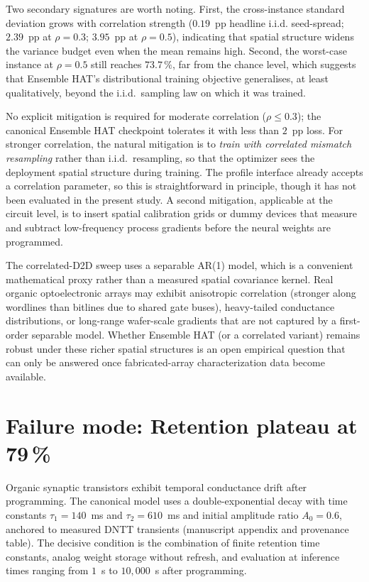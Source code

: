 Two secondary signatures are worth noting.  First, the cross-instance standard deviation grows with correlation strength ($0.19$~pp headline i.i.d. seed-spread; $2.39$~pp at $\rho=0.3$; $3.95$~pp at $\rho=0.5$), indicating that spatial structure widens the variance budget even when the mean remains high.  Second, the worst-case instance at $\rho=0.5$ still reaches $73.7\,\%$, far from the chance level, which suggests that Ensemble HAT's distributional training objective generalises, at least qualitatively, beyond the i.i.d.~sampling law on which it was trained.

No explicit mitigation is required for moderate correlation ($\rho \le 0.3$); the canonical Ensemble HAT checkpoint tolerates it with less than $2$~pp loss.  For stronger correlation, the natural mitigation is to \emph{train with correlated mismatch resampling} rather than i.i.d.~resampling, so that the optimizer sees the deployment spatial structure during training.  The profile interface already accepts a correlation parameter, so this is straightforward in principle, though it has not been evaluated in the present study.  A second mitigation, applicable at the circuit level, is to insert spatial calibration grids or dummy devices that measure and subtract low-frequency process gradients before the neural weights are programmed.

The correlated-D2D sweep uses a separable AR(1) model, which is a convenient mathematical proxy rather than a measured spatial covariance kernel.  Real organic optoelectronic arrays may exhibit anisotropic correlation (stronger along wordlines than bitlines due to shared gate buses), heavy-tailed conductance distributions, or long-range wafer-scale gradients that are not captured by a first-order separable model.  Whether Ensemble HAT (or a correlated variant) remains robust under these richer spatial structures is an open empirical question that can only be answered once fabricated-array characterization data become available.


\section{Failure mode: Retention plateau at 79\,\%}
\label{sec:failure-retention-plateau}

Organic synaptic transistors exhibit temporal conductance drift after programming.  The canonical model uses a double-exponential decay with time constants $\tau_{1}=140$~ms and $\tau_{2}=610$~ms and initial amplitude ratio $A_{0}=0.6$, anchored to measured DNTT transients (manuscript appendix and provenance table).  The decisive condition is the combination of finite retention time constants, analog weight storage without refresh, and evaluation at inference times ranging from $1$~s to $10{,}000$~s after programming.

